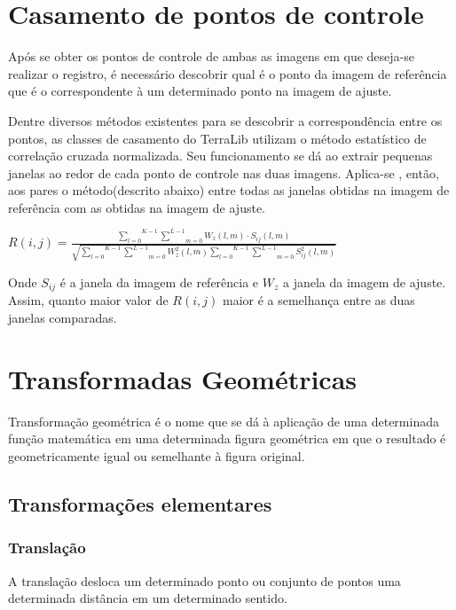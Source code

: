 \documentclass[9pt, a4paper, nofonttune, journal]{IEEEtran}
\begin{document}
\section{Casamento de pontos de controle}
Após se obter os pontos de controle de ambas as imagens em que deseja-se realizar o registro,
é necessário descobrir qual é o ponto da imagem de referência que é o correspondente à um determinado ponto na imagem de ajuste. 

Dentre diversos métodos existentes para se descobrir a correspondência entre os pontos, as classes de casamento do TerraLib utilizam
o método estatístico de correlação cruzada normalizada.
Seu funcionamento se dá ao extrair pequenas janelas ao redor de cada ponto de controle nas duas imagens.
Aplica-se , então, aos pares o método(descrito abaixo) entre todas as janelas obtidas na imagem de referência com as obtidas na imagem de ajuste.\cite{Fedorov1}\cite{Leila1}\cite{Zhao1}
\begin{center}
$R(i,j)=\frac{\overset{K-1}{\underset{l=0}{\sum}}\underset{m=0}{\overset{L-1}{\sum}}W_{z}(l,m)\cdot S_{ij}(l,m)}{\sqrt{\overset{K-1}{\underset{l=0}{\sum}}\underset{m=0}{\overset{L-1}{\sum}}W_{z}^{2}(l,m)\overset{K-1}{\underset{l=0}{\sum}}\underset{m=0}{\overset{L-1}{\sum}}S_{ij}^{2}(l,m)}}$\end{center}
Onde $S_{ij}$ é a janela da imagem de referência e $W_{z}$ a janela da imagem de ajuste.
Assim, quanto maior valor de $R(i,j)$ maior é a semelhança entre as duas janelas comparadas.



\section{Transformadas Geométricas}
Transformação geométrica é o nome que se dá à aplicação de uma determinada função matemática em uma determinada figura geométrica 
em que o resultado é geometricamente igual ou semelhante à figura original.

\subsection{Transformações elementares}
\subsubsection{Translação}
A translação desloca um determinado ponto ou conjunto de pontos uma determinada distância em um determinado sentido.
\end{document}

